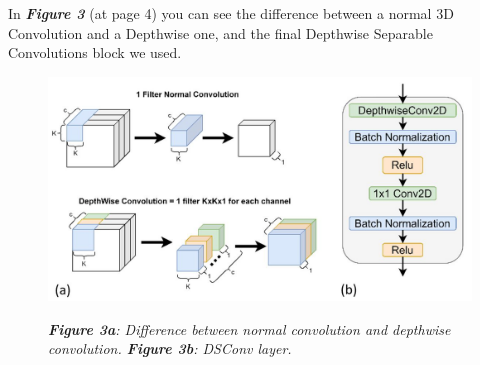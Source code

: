 \documentclass[conference]{IEEEtran}
\begin{document}
In \textbf{\textit{Figure 3}} (at page 4) you can see the difference between a normal 3D Convolution and a Depthwise one, and the final Depthwise Separable Convolutions block we used. 
\begin{figure}[t]
\centering
\includegraphics[scale=0.56]{confronto3}
\begin{small}\textit{\textbf{Figure 3a}: Difference between normal convolution and depthwise convolution. \textbf{Figure 3b}: DSConv layer.}
\end{small}
\end{figure}
\end{document}
